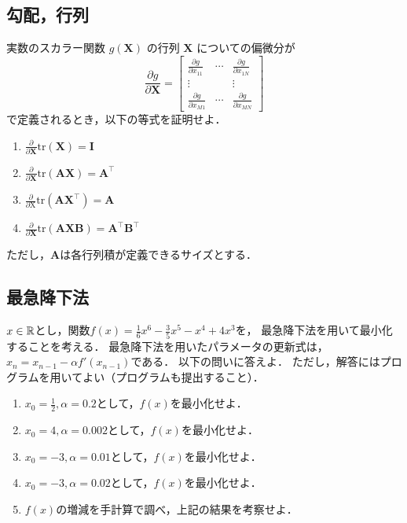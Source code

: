 \subsection{勾配，行列}
  実数のスカラー関数 $g(\mathbf X)$ の行列 $\mathbf X$ についての偏微分が
  \begin{equation}
    \frac{\partial g}{\partial \mathbf X} =
    \begin{bmatrix}
      \displaystyle
      \frac{\partial g}{\partial x_{11}}&\cdots&\displaystyle \frac{\partial g}{\partial x_{1N}}\\
      \vdots& &\vdots\\
      \displaystyle \frac{\partial g}{\partial x_{M1}}&\cdots&\displaystyle \frac{\partial g}{\partial x_{MN}}
    \end{bmatrix}
  \end{equation}
  で定義されるとき，以下の等式を証明せよ．
  \begin{enumerate}[label=(\roman*)]
    \item $\frac{\partial}{\partial \mathbf{X}}{\mathrm{tr}}(\mathbf{X})={\mathbf{I}}$
    \item $\frac{\partial}{\partial \mathbf{X}}{\mathrm{tr}}({\mathbf{A}}{\mathbf{X}})={\mathbf{A}}^{\top}$
    \item $\frac{\partial}{\partial \mathrm{X}}{\mathrm{tr}}({\mathbf{A}}{\mathbf{X}}^{\top})={\mathbf{A}}$
    \item $\frac{\partial}{\partial \mathbf{X}}{\mathrm{tr}}({\mathbf{A}}{\mathbf{X}}{\mathbf{B}})={\mathbf{A}}^{\top}{\mathbf{B}}^{\top}$
  \end{enumerate}
  ただし，$\mathbf{A}$は各行列積が定義できるサイズとする．

\subsection{最急降下法}
  $x \in \mathbb{R}$とし，関数$f(x) = \frac{1}{6}x^6 - \frac{3}{5}x^5 - x^4 + 4x^3$を，
  最急降下法を用いて最小化することを考える．
  最急降下法を用いたパラメータの更新式は，$x_n = x_{n-1} - \alpha f'(x_{n-1})$である．
  以下の問いに答えよ．
  ただし，解答にはプログラムを用いてよい（プログラムも提出すること）．
  \begin{enumerate}[label=(\roman*)]
    \item $x_0 = \frac{1}{2}, \alpha = 0.2$として，$f(x)$を最小化せよ．
    \item $x_0 = 4, \alpha = 0.002$として，$f(x)$を最小化せよ．
    \item $x_0 = -3, \alpha = 0.01$として，$f(x)$を最小化せよ．
    \item $x_0 = -3, \alpha = 0.02$として，$f(x)$を最小化せよ．
    \item $f(x)$の増減を手計算で調べ，上記の結果を考察せよ．
  \end{enumerate}


